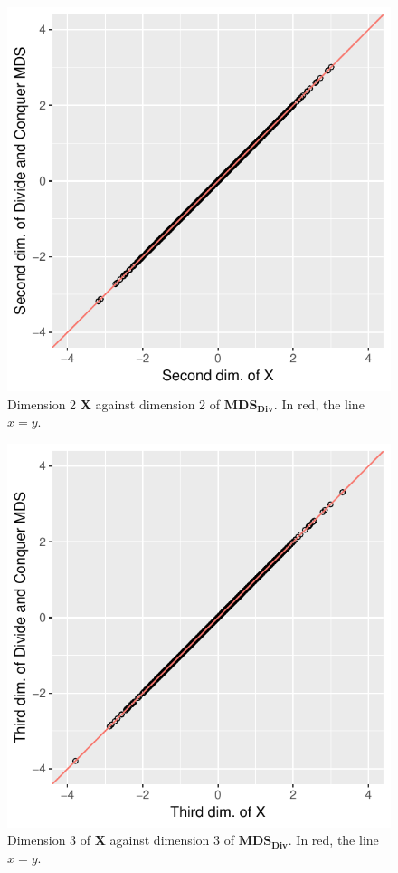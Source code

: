 \documentclass[11pt]{report}
\begin{document}
\FloatBarrier

\begin{figure}
    \centering
    \includegraphics[scale = 1]{./images/second_div.pdf}
    \caption{Dimension 2 \textbf{X} against dimension 2 of $\mathbf{MDS_{Div}}$. In red, the line $x=y$.}
    \label{divide_example2}
\end{figure}

\FloatBarrier

\begin{figure}
    \centering
    \includegraphics[scale = 1]{./images/third_div.pdf} 
    \caption{Dimension 3 of \textbf{X} against dimension 3 of $\mathbf{MDS_{Div}}$. In red, the line $x=y$.}
    \label{divide_example3}
\end{figure}
\end{document}
